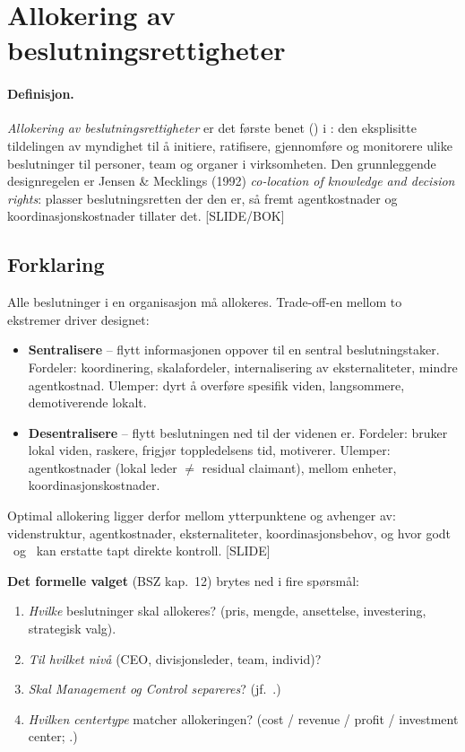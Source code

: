 \section{Allokering av beslutningsrettigheter}\label{thr:decision-rights-allocation}

\paragraph{Definisjon.} \emph{Allokering av beslutningsrettigheter} er det første benet (\SOne) i : den eksplisitte tildelingen av myndighet til å initiere, ratifisere, gjennomføre og monitorere ulike beslutninger til personer, team og organer i virksomheten. Den grunnleggende designregelen er Jensen \& Mecklings (1992) \emph{co-location of knowledge and decision rights}: plasser beslutningsretten der den  er, så fremt agentkostnader og koordinasjonskostnader tillater det. [SLIDE/BOK]

\subsection*{Forklaring}

Alle beslutninger i en organisasjon må allokeres. Trade-off-en mellom to ekstremer driver designet:
\begin{itemize}
\item \textbf{Sentralisere} -- flytt informasjonen oppover til en sentral beslutningstaker. Fordeler: koordinering, skalafordeler, internalisering av eksternaliteter, mindre agentkostnad. Ulemper: dyrt å overføre spesifik viden, langsommere, demotiverende lokalt.
\item \textbf{Desentralisere} -- flytt beslutningen ned til der videnen er. Fordeler: bruker lokal viden, raskere, frigjør toppledelsens tid, motiverer. Ulemper: agentkostnader (lokal leder $\neq$ residual claimant),  mellom enheter, koordinasjonskostnader.
\end{itemize}
Optimal allokering ligger derfor mellom ytterpunktene og avhenger av: videnstruktur, agentkostnader, eksternaliteter, koordinasjonsbehov, og hvor godt \STwo\ og \SThree\ kan erstatte tapt direkte kontroll. [SLIDE]

\textbf{Det formelle valget} (BSZ kap.\ 12) brytes ned i fire spørsmål:
\begin{enumerate}
\item \emph{Hvilke} beslutninger skal allokeres? (pris, mengde, ansettelse, investering, strategisk valg).
\item \emph{Til hvilket nivå} (CEO, divisjonsleder, team, individ)?
\item \emph{Skal Management og Control separeres}? (jf.\ .)
\item \emph{Hvilken centertype} matcher allokeringen? (cost / revenue / profit / investment center; .)
\end{enumerate}

